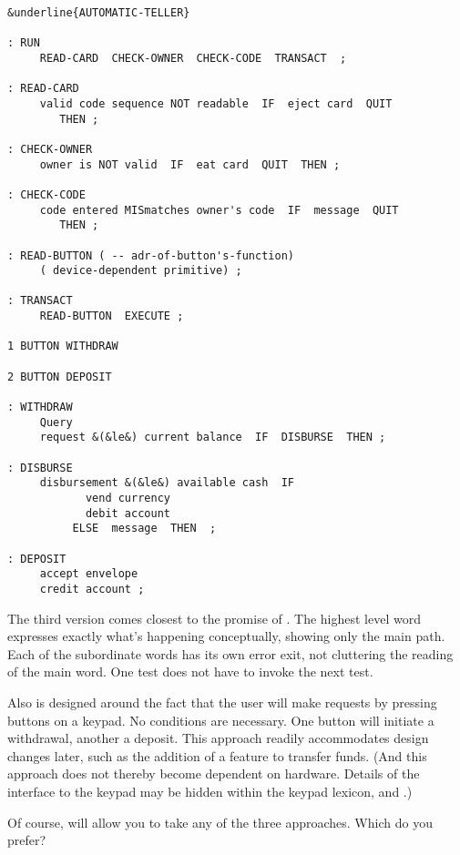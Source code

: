 \begin{figure*}[tttt]
\begin{center}
\small\begin{BVerbatim}[commandchars=\&\{\},baselinestretch=0.85]
&underline{AUTOMATIC-TELLER}

: RUN
     READ-CARD  CHECK-OWNER  CHECK-CODE  TRANSACT  ;

: READ-CARD
     valid code sequence NOT readable  IF  eject card  QUIT
        THEN ;

: CHECK-OWNER
     owner is NOT valid  IF  eat card  QUIT  THEN ;

: CHECK-CODE
     code entered MISmatches owner's code  IF  message  QUIT
        THEN ;

: READ-BUTTON ( -- adr-of-button's-function)
     ( device-dependent primitive) ;

: TRANSACT
     READ-BUTTON  EXECUTE ;

1 BUTTON WITHDRAW

2 BUTTON DEPOSIT

: WITHDRAW
     Query
     request &(&le&) current balance  IF  DISBURSE  THEN ;

: DISBURSE
     disbursement &(&le&) available cash  IF
            vend currency
            debit account
          ELSE  message  THEN  ;

: DEPOSIT
     accept envelope
     credit account ;
\end{BVerbatim}
\end{center}
\end{figure*}

The third version comes closest to the promise of \Forth{}. The highest
level word expresses exactly what's happening conceptually, showing only
the main path. Each of the subordinate words has its own error exit, not
cluttering the reading of the main word. One test does not have to invoke
the next test.

Also  is designed around the fact that the user will make
requests by pressing buttons on a keypad. No conditions are necessary. One
button will initiate a withdrawal, another a deposit. This approach
readily accommodates design changes later, such as the addition of a
feature to transfer funds. (And this approach does not thereby become
dependent on hardware. Details of the interface to the keypad may be
hidden within the keypad lexicon,  and .)

Of course, \Forth{} will allow you to take any of the three approaches.
Which do you prefer?

